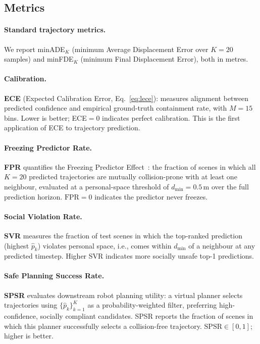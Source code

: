 \subsection{Metrics}
\label{sec:exp:metrics}

\paragraph{Standard trajectory metrics.}
We report minADE\(_K\) (minimum Average Displacement Error over \(K=20\)
samples) and minFDE\(_K\) (minimum Final Displacement Error), both in metres.

\paragraph{Calibration.}
\textbf{ECE} (Expected Calibration Error, Eq.~\eqref{eq:lece}): measures
alignment between predicted confidence and empirical ground-truth containment
rate, with \(M=15\) bins. Lower is better; ECE\(=0\) indicates perfect
calibration. This is the first application of ECE to trajectory prediction.

\paragraph{Freezing Predictor Rate.}
\textbf{FPR} quantifies the Freezing Predictor
Effect~\cite{trautman2010unfreezing}: the fraction of scenes in which all
\(K=20\) predicted trajectories are mutually collision-prone with at least one
neighbour, evaluated at a personal-space threshold of
\(d_{\min} = 0.5\)\,m over the full prediction horizon.
\(\text{FPR} = 0\) indicates the predictor never freezes.

\paragraph{Social Violation Rate.}
\textbf{SVR} measures the fraction of test scenes in which the top-ranked
prediction (highest \(\hat{p}_k\)) violates personal space, i.e., comes within
\(d_{\min}\) of a neighbour at any predicted timestep. Higher SVR indicates
more socially unsafe top-1 predictions.

\paragraph{Safe Planning Success Rate.}
\textbf{SPSR} evaluates downstream robot planning utility: a virtual planner
selects trajectories using \(\{\hat{p}_k\}_{k=1}^{K}\) as a
probability-weighted filter, preferring high-confidence, socially compliant
candidates. SPSR reports the fraction of scenes in which this planner
successfully selects a collision-free trajectory.
\(\text{SPSR} \in [0,1]\); higher is better.

